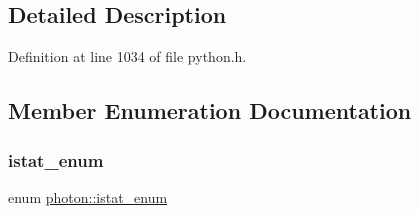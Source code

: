 \subsection{Detailed Description}


Definition at line 1034 of file python.\+h.



\subsection{Member Enumeration Documentation}
\mbox{\label{structphoton_ae56bb7ca587dc91f44d8c72a6a571f45}} 
\subsubsection{\texorpdfstring{istat\+\_\+enum}{istat\_enum}}
{\footnotesize\ttfamily enum \hyperlink{structphoton_ae56bb7ca587dc91f44d8c72a6a571f45}{photon\+::istat\+\_\+enum}}


